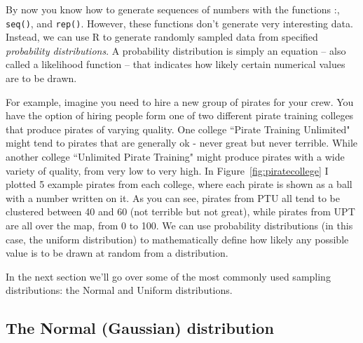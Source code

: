 \documentclass{tufte-book}\usepackage[]{graphicx}\usepackage[]{color}
\begin{document}
By now you know how to generate sequences of numbers with the functions :, \texttt{seq()}, and \texttt{rep()}. However, these functions don't generate very interesting data. Instead, we can use R to generate randomly sampled data from specified \textit{probability distributions}. A probability distribution is simply an equation -- also called a likelihood function -- that indicates how likely certain numerical values are to be drawn.


For example, imagine you need to hire a new group of pirates for your crew. You have the option of hiring people form one of two different pirate training colleges that produce pirates of varying quality. One college ``Pirate Training Unlimited" might tend to pirates that are generally ok - never great but never terrible. While another college ``Unlimited Pirate Training" might produce pirates with a wide variety of quality, from very low to very high. In Figure~\ref{fig:piratecollege} I plotted 5 example pirates from each college, where each pirate is shown as a ball with a number written on it. As you can see, pirates from PTU all tend to be clustered between 40 and 60 (not terrible but not great), while pirates from UPT are all over the map, from 0 to 100. We can use probability distributions (in this case, the uniform distribution) to mathematically define how likely any possible value is to be drawn at random from a distribution.


In the next section we'll go over some of the most commonly used sampling distributions: the Normal and Uniform distributions.

\pagebreak
\subsection{The Normal (Gaussian) distribution}
\end{document}
